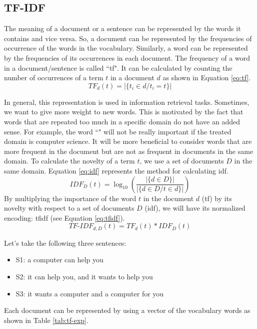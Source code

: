 \documentclass{KBook}
\begin{document}
\subsection{TF-IDF}

The meaning of a document or a sentence can be represented by the words it contains and vice versa.
So, a document can be represented by the frequencies of occurrence of the words in the vocabulary. 
Similarly, a word can be represented by the frequencies of its occurrences in each document.
The frequency of a word in a document/sentence is called ``\ac{tf}".
It can be calculated by counting the number of occurrences of a term $t$ in a document $d$ as shown in Equation \ref{eq:tf}.
\begin{equation}
	TF_d(t) =  |\{t_i \in d / t_i = t\}|
	\label{eq:tf}
\end{equation}

In general, this representation is used in information retrieval tasks.
Sometimes, we want to give more weight to new words. 
This is motivated by the fact that words that are repeated too much in a specific domain do not have an added sense.
For example, the word ``" will not be really important if the treated domain is computer science. 
It will be more beneficial to consider words that are more frequent in the document but are not as frequent in documents in the same domain.
To calculate the novelty of a term $t$, we use a set of documents $D$ in the same domain. 
Equation \ref{eq:idf} represents the method for calculating \ac{idf}.
\begin{equation}
	IDF_D(t) = \log_{10} \left( \frac{|\{d \in D\}|}{|\{d \in D / t \in d\}|} \right)
	\label{eq:idf}
\end{equation}
By multiplying the importance of the word $t$ in the document $d$ (\ac{tf}) by its novelty with respect to a set of documents $D$ (\ac{idf}), we will have its normalized encoding: \ac{tfidf} (see Equation \ref{eq:tfidf}).
\begin{equation}
	TF\text{-}IDF_{d, D}(t) = TF_d(t) * IDF_D(t)
	\label{eq:tfidf}
\end{equation}

Let's take the following three sentences:
\begin{itemize}
	\item S1: a computer can help you
	\item S2: it can help you, and it wants to help you
	\item S3: it wants a computer and a computer for you
\end{itemize}
Each document can be represented by using a vector of the vocabulary words as shown in Table \ref{tab:tf-exp}.
\end{document}
